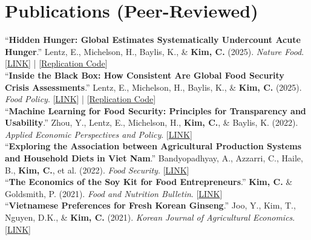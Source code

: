 \documentclass[a4paper,11pt]{article}
\begin{document}
\section{\textbf{Publications (Peer-Reviewed)}}
\small{

“\textbf{Hidden Hunger: Global Estimates Systematically Undercount Acute Hunger}.” Lentz, E., Michelson, H., Baylis, K., \& \textbf{Kim, C.} (2025). \colorbox{gray!10}{\textit{Nature Food}}. [\href{https://doi.org/10.1038/s43016-025-01267-z}{LINK}] | [{\href{https://github.com/mnmx0101/IPC_Paper}{Replication Code}}] \\[6pt]

“\textbf{Inside the Black Box: How Consistent Are Global Food Security Crisis Assessments}.” Lentz, E., Michelson, H., Baylis, K., \& \textbf{Kim, C.} (2025). \colorbox{gray!10}{\textit{Food Policy}}. [\href{https://doi.org/10.1016/j.foodpol.2025.103028}{LINK}] | [{\href{https://github.com/mnmx0101/ipc_consistency_paper}{Replication Code}}] \\[6pt]

“\textbf{Machine Learning for Food Security: Principles for Transparency and Usability}.” Zhou, Y., Lentz, E., Michelson, H., \textbf{Kim, C.}, \& Baylis, K. (2022). \colorbox{gray!10}{\textit{Applied Economic Perspectives and Policy}}. [\href{https://doi.org/10.1002/aepp.13214}{LINK}] \\[6pt]

“\textbf{Exploring the Association between Agricultural Production Systems and Household Diets in Viet Nam}.” Bandyopadhyay, A., Azzarri, C., Haile, B., \textbf{Kim, C.}, et al. (2022). \colorbox{gray!10}{\textit{Food Security}}. [\href{https://doi.org/10.1007/s12571-022-01276-x}{LINK}] \\[6pt]

“\textbf{The Economics of the Soy Kit for Food Entrepreneurs}.” \textbf{Kim, C.} \& Goldsmith, P. (2021). \colorbox{gray!10}{\textit{Food and Nutrition Bulletin}}. [\href{https://doi.org/10.1177/0379572120981183}{LINK}] \\[6pt]

“\textbf{Vietnamese Preferences for Fresh Korean Ginseng}.” Joo, Y., Kim, T., Nguyen, D.K., \& \textbf{Kim, C.} (2021). \colorbox{gray!10}{\textit{Korean Journal of Agricultural Economics}}. [\href{https://doi.org/10.24997/KJAE.2021.62.3.177}{LINK}]

}

\end{document}
